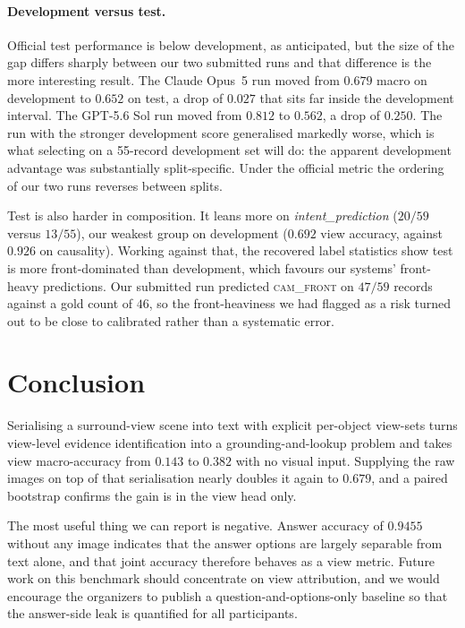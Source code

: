 \documentclass[11pt]{article}
\begin{document}
\paragraph{Development versus test.} Official test performance is below
development, as anticipated, but the size of the gap differs sharply between our
two submitted runs and that difference is the more interesting result. The
Claude Opus~5 run moved from $0.679$ macro on development to $0.652$ on test, a
drop of $0.027$ that sits far inside the development interval. The GPT-5.6 Sol
run moved from $0.812$ to $0.562$, a drop of $0.250$. The run with the stronger development score
generalised markedly worse, which is what selecting on a 55-record development
set will do: the apparent development advantage was substantially
split-specific. Under the official metric the ordering of our two runs reverses
between splits.

Test is also harder in composition. It leans more on
\textit{intent\_prediction} ($20/59$ versus $13/55$), our weakest group on
development ($0.692$ view accuracy, against $0.926$ on causality). Working
against that, the recovered label statistics show test is more front-dominated
than development, which favours our systems' front-heavy predictions. Our
submitted run predicted \textsc{cam\_front} on $47/59$ records against a gold
count of $46$, so the front-heaviness we had flagged as a risk turned out to be
close to calibrated rather than a systematic error.

\section{Conclusion}
\label{sec:conclusion}

Serialising a surround-view scene into text with explicit per-object view-sets
turns view-level evidence identification into a grounding-and-lookup problem
and takes view macro-accuracy from $0.143$ to $0.382$ with no visual input.
Supplying the raw images on top of that serialisation nearly doubles it again
to $0.679$, and a paired bootstrap confirms the gain is in the view head only.

The most useful thing we can report is negative. Answer accuracy of $0.9455$
without any image indicates that the answer options are largely separable from
text alone, and that joint accuracy therefore behaves as a view metric. Future
work on this benchmark should concentrate on view attribution, and we would
encourage the organizers to publish a question-and-options-only baseline so
that the answer-side leak is quantified for all participants.
\end{document}

